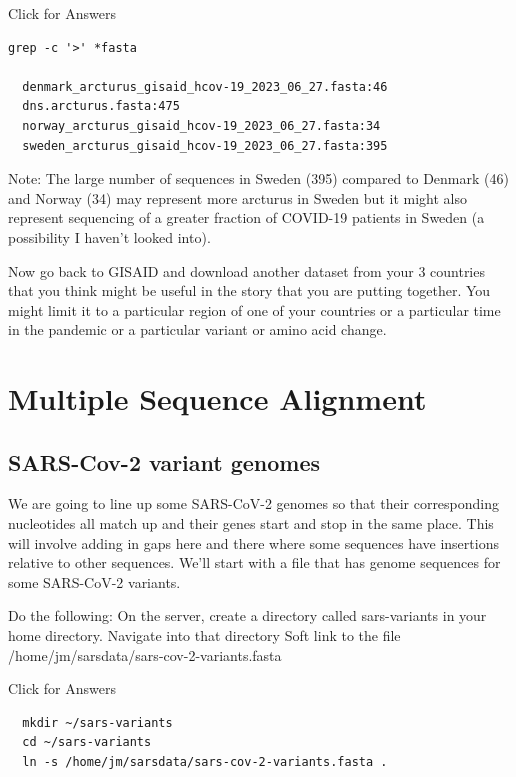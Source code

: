 \documentclass[
]{book}
\begin{document}
Click for Answers

\begin{verbatim}
grep -c '>' *fasta

  denmark_arcturus_gisaid_hcov-19_2023_06_27.fasta:46
  dns.arcturus.fasta:475
  norway_arcturus_gisaid_hcov-19_2023_06_27.fasta:34
  sweden_arcturus_gisaid_hcov-19_2023_06_27.fasta:395
\end{verbatim}

\hfill\break

Note: The large number of sequences in Sweden (395) compared to Denmark (46) and Norway (34) may represent more arcturus in Sweden but it might also represent sequencing of a greater fraction of COVID-19 patients in Sweden (a possibility I haven't looked into).

Now go back to GISAID and download another dataset from your 3 countries that you think might be useful in the story that you are putting together. You might limit it to a particular region of one of your countries or a particular time in the pandemic or a particular variant or amino acid change.

\hypertarget{multiple-sequence-alignment}{%
\chapter{Multiple Sequence Alignment}\label{multiple-sequence-alignment}}

\hypertarget{sars-cov-2-variant-genomes}{%
\section{SARS-Cov-2 variant genomes}\label{sars-cov-2-variant-genomes}}

We are going to line up some SARS-CoV-2 genomes so that their corresponding nucleotides all match up and their genes start and stop in the same place. This will involve adding in gaps here and there where some sequences have insertions relative to other sequences. We'll start with a file that has genome sequences for some SARS-CoV-2 variants.

Do the following:
On the server, create a directory called sars-variants in your home directory.
Navigate into that directory
Soft link to the file /home/jm/sarsdata/sars-cov-2-variants.fasta

Click for Answers

\begin{verbatim}
  mkdir ~/sars-variants
  cd ~/sars-variants
  ln -s /home/jm/sarsdata/sars-cov-2-variants.fasta .
\end{verbatim}
\end{document}
